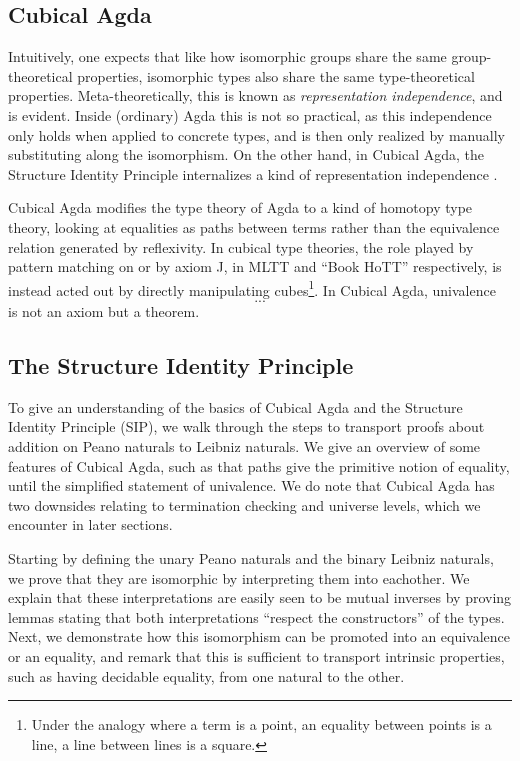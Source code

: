 \subsection{Cubical Agda}
Intuitively, one expects that like how isomorphic groups share the same group-theoretical properties, isomorphic types also share the same type-theoretical properties. Meta-theoretically, this is known as \emph{representation independence}, and is evident. Inside (ordinary) Agda this is not so practical, as this independence only holds when applied to concrete types, and is then only realized by manually substituting along the isomorphism. On the other hand, in Cubical Agda, the Structure Identity Principle internalizes a kind of representation independence \cite{iri}.

Cubical Agda modifies the type theory of Agda to a kind of homotopy type theory, looking at equalities as paths between terms rather than the equivalence relation generated by reflexivity. In cubical type theories, the role played by pattern matching on  or by axiom J, in MLTT and ``Book HoTT'' respectively, is instead acted out by directly manipulating cubes\footnote{Under the analogy where a term is a point, an equality between points is a line, a line between lines is a square.}. In Cubical Agda, univalence
\[ ... \]
is not an axiom but a theorem.



\subsection{The Structure Identity Principle}\label{sec:leibniz}
To give an understanding of the basics of Cubical Agda \cite{cuagda} and the Structure Identity Principle (SIP), we walk through the steps to transport proofs about addition on Peano naturals to Leibniz naturals. We give an overview of some features of Cubical Agda, such as that paths give the primitive notion of equality, until the simplified statement of univalence. We do note that Cubical Agda has two downsides relating to termination checking and universe levels, which we encounter in later sections.

Starting by defining the unary Peano naturals and the binary Leibniz naturals, we prove that they are isomorphic by interpreting them into eachother. We explain that these interpretations are easily seen to be mutual inverses by proving lemmas stating that both interpretations ``respect the constructors'' of the types. Next, we demonstrate how this isomorphism can be promoted into an equivalence or an equality, and remark that this is sufficient to transport intrinsic properties, such as having decidable equality, from one natural to the other.

